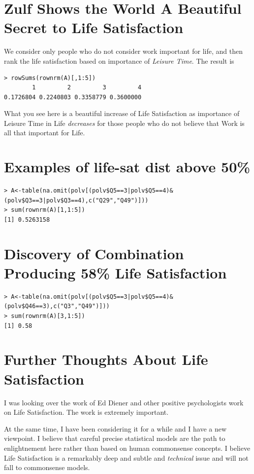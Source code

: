 \documentclass{amsart}
\begin{document}
\section{Zulf Shows the World A Beautiful Secret to Life Satisfaction}

We consider only people who do not consider work important for life, and then rank the life satisfaction based on importance of {\em Leisure Time}.  The result is
\begin{verbatim}
> rowSums(rownrm(A)[,1:5])
        1         2         3         4 
0.1726804 0.2240803 0.3358779 0.3600000 
\end{verbatim}

What you see here is a beautiful increase of Life Satisfaction as importance of Leisure Time in Life {\em decreases} for those people who do not believe that Work is all that important for Life.

\section{Examples of life-sat dist above 50\%}

\begin{verbatim}
> A<-table(na.omit(polv[(polv$Q5==3|polv$Q5==4)&(polv$Q3==3|polv$Q3==4),c("Q29","Q49")]))
> sum(rownrm(A)[1,1:5])
[1] 0.5263158
\end{verbatim}


\section{Discovery of Combination Producing 58\% Life Satisfaction}

\begin{verbatim}
> A<-table(na.omit(polv[(polv$Q5==3|polv$Q5==4)&(polv$Q46==3),c("Q3","Q49")]))
> sum(rownrm(A)[3,1:5])
[1] 0.58
\end{verbatim}


\section{Further Thoughts About Life Satisfaction}

I was looking over the work of Ed Diener and other positive psychologists work on Life Satisfaction.  The work is extremely important. 

At the same time, I have been considering it for a while and I have a new viewpoint.  I believe that careful precise statistical models are the path to enlightnement here rather than based on human commonsense concepts.  I believe Life Satisfaction is a remarkably deep and subtle and {\em technical} issue and will not fall to commonsense models.  
\end{document}
